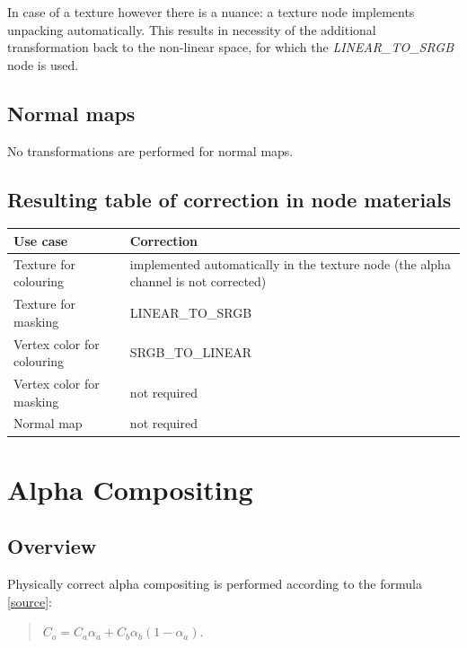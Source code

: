 \documentclass[a4paper,12pt,oneside]{sphinxmanual}
\begin{document}
In case of a texture however there is a nuance: a texture node implements unpacking automatically. This results in necessity of the additional transformation back to the non-linear space, for which the \emph{LINEAR\_TO\_SRGB} node is used.


\subsection{Normal maps}
\label{gamma_alpha:id8}
No transformations are performed for normal maps.


\subsection{Resulting table of correction in node materials}
\label{gamma_alpha:id9}
\begin{tabulary}{\linewidth}{|L|L|}
\hline
\textsf{\relax 
Use case
} & \textsf{\relax 
Correction
}\\
\hline
Texture for colouring
 & 
implemented automatically in the texture node (the alpha channel is not corrected)
\\

Texture for masking
 & 
LINEAR\_TO\_SRGB
\\

Vertex color for colouring
 & 
SRGB\_TO\_LINEAR
\\

Vertex color for masking
 & 
not required
\\

Normal map
 & 
not required
\\
\hline\end{tabulary}



\section{Alpha Compositing}
\label{gamma_alpha:id10}

\subsection{Overview}
\label{gamma_alpha:id11}
Physically correct alpha compositing is performed according to the formula {[}\href{http://wwwnew.cs.princeton.edu/courses/archive/spring05/cos426/papers/smith95a.pdf}{source}{]}:
\begin{quote}

\(C_o = C_a \alpha_a + C_b \alpha_b (1 - \alpha_a)\).
\end{quote}
\end{document}
